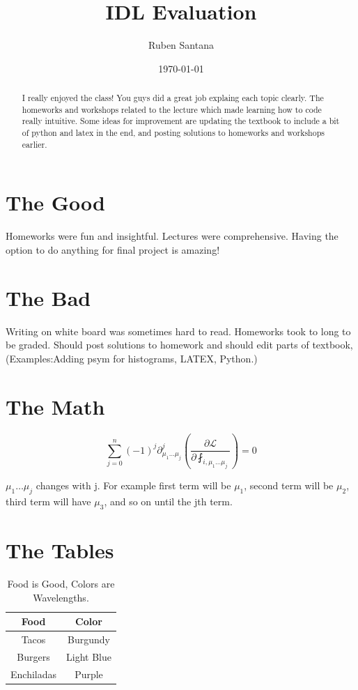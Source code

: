 \documentclass[12pt]{article}
\begin{document}
\title{IDL Evaluation}
\author{Ruben Santana}
\date{\today}
\maketitle

\begin{abstract}
I really enjoyed the class! You guys did a great job explaing each topic clearly. The homeworks and workshops related to the lecture which made learning how to code really intuitive. Some ideas for improvement are updating the textbook to include a bit of python and latex in the end, and posting solutions to homeworks and workshops earlier.
\end{abstract}

\section{The Good}
Homeworks were fun and insightful.
Lectures were comprehensive.
Having the option to do anything for final project is amazing!

\section{The Bad}
Writing on white board was sometimes hard to read.
Homeworks took to long to be graded.
Should post solutions to homework and should edit parts of textbook, (Examples:Adding psym for histograms, LATEX, Python.)

\section{The Math}
\begin{equation}
\sum_{j=0}^{n}
(-1)^{j}
\partial ^{j} _{\mu _1 \dots \mu _j}
\left(\frac{\partial \mathcal{L}}{\partial\fint_{i,\mu _1 \dots \mu _j}} \right) = 0
\end{equation}


$\mu _1\dots\mu _j$ changes with j. For example first term will be $\mu _1$, second term will be $\mu _2$, third term will have $\mu _3$, and so on until the jth term.

\section{The Tables}
\begin{table}[H]
  \begin{center}
  \begin{tabular}{|c|c|}
    \hline
    Food & Color\\
    \hline
    Tacos & Burgundy \\
    Burgers & Light Blue  \\
    Enchiladas & Purple
    \tabularnewline
    \hline
  \end{tabular}
  \end{center}
  \caption{Food is Good, Colors are Wavelengths.}
  \label{tab:foodcolor}
\end{table}
\end{document}
